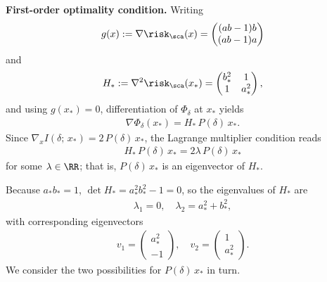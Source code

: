 \documentclass{article}
\begin{document}
\textbf{First-order optimality condition.}
Writing
\begin{align}
    g(x) := \nabla \risk_\sca(x)
    =
    \begin{pmatrix}
        (ab - 1)b \\
        (ab - 1)a
    \end{pmatrix}
\end{align}
and
\begin{align}
    H_* := \nabla^2 \risk_\sca(x_*)
    =
    \begin{pmatrix}
        b_*^2 & 1 \\
        1 & a_*^2
    \end{pmatrix},
\end{align}
and using $g(x_*) = 0$, differentiation of $\Phi_\delta$ at $x_*$ yields
\begin{align}
    \nabla \Phi_\delta(x_*) = H_*\, P(\delta)\, x_*.
\end{align}
Since $\nabla_x I(\delta;\, x_*) = 2\, P(\delta)\, x_*$, the Lagrange
multiplier condition reads
\begin{align}
    H_*\, P(\delta)\, x_* = 2\lambda\, P(\delta)\, x_*
    \label{eq:appendix_lagrange_eigenvector}
\end{align}
for some $\lambda \in \RR$; that is, $P(\delta)\, x_*$ is an eigenvector of
$H_*$.

Because $a_* b_* = 1$,
$\det H_* = a_*^2 b_*^2 - 1 = 0$,
so the eigenvalues of $H_*$ are
\begin{align}
    \lambda_1 = 0,
    \quad
    \lambda_2 = a_*^2 + b_*^2,
\end{align}
with corresponding eigenvectors
\begin{align}
    v_1 =
    \begin{pmatrix}
        a_*^2 \\
        -1
    \end{pmatrix},
    \quad
    v_2 =
    \begin{pmatrix}
        1 \\
        a_*^2
    \end{pmatrix}.
\end{align}
We consider the two possibilities for $P(\delta)\, x_*$ in turn.
\end{document}
